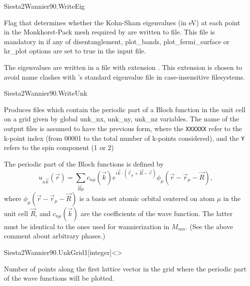 \begin{fdflogicalF}{Siesta2Wannier90.WriteEig}
  
  Flag that determines whether the Kohn-Sham eigenvalues (in eV) at
  each point in the Monkhorst-Pack mesh required by
   are written to file.  This file is mandatory in
   if any of disentanglement, plot\_bands,
  plot\_fermi\_surface or hr\_plot options are set to true in the
   input file.

  The eigenvalues are written in a file with extension .
  This extension is chosen to avoid name clashes with \siesta's
  standard eigenvalue file in case-insensitive filesystems.

\end{fdflogicalF}

\begin{fdflogicalF}{Siesta2Wannier90.WriteUnk}
  
  Produces  files which contain the periodic part
  of a Bloch function in the unit cell on a grid given by global
  unk\_nx, unk\_ny, unk\_nz variables.  The name of the output files
  is assumed to have the previous form, where the \texttt{XXXXXX}
  refer to the k-point index (from 00001 to the total number of
  k-points considered), and the \texttt{Y} refers to the spin
  component (1 or 2)

  The periodic part of the Bloch functions is defined by
  \begin{equation}
    u_{n \vec{k}} (\vec{r}) =
    \sum_{\vec{R} \mu} c_{n \mu}(\vec{k})
    e^{i \vec{k} \cdot ( \vec{r}_{\mu} + \vec{R} - \vec{r} )}
    \phi_{\mu} (\vec{r} - \vec{r}_{\mu} - \vec{R} ) ,
  \end{equation}
  where $\phi_{\mu} (\vec{r} - \vec{r}_{\mu} - \vec{R} )$ is a basis
  set atomic orbital centered on atom $\mu$ in the unit cell
  $\vec{R}$, and $c_{n \mu}(\vec{k})$ are the coefficients of the wave
  function. The latter must be identical to the ones used for
  wannierization in $M_{mn}$. (See the above comment about arbitrary
  phases.)

\end{fdflogicalF}

\begin{fdfentry}{Siesta2Wannier90.UnkGrid1}[integer]<>

  Number of points along the first lattice vector in the grid where
  the periodic part of the wave functions will be plotted.

\end{fdfentry}

